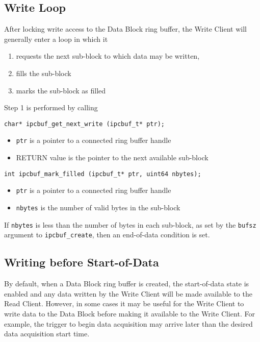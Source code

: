 \subsection{Write Loop}

After locking write access to the Data Block ring buffer, the Write
Client will generally enter a loop in which it
\begin{enumerate}
\item requests the next sub-block to which data may be written, 
\vspace{-2mm}
\item fills the sub-block
\vspace{-2mm}
\item marks the sub-block as filled
\end{enumerate}
Step 1 is performed by calling
\begin{verbatim}
char* ipcbuf_get_next_write (ipcbuf_t* ptr);
\end{verbatim}
\vspace{-6mm}
\begin{itemize}
\item {\tt ptr} is a pointer to a connected ring buffer handle
\vspace{-2mm}
\item RETURN value is the pointer to the next available sub-block
\end{itemize}
\begin{verbatim}
int ipcbuf_mark_filled (ipcbuf_t* ptr, uint64 nbytes);
\end{verbatim}
\vspace{-6mm}
\begin{itemize}
\item {\tt ptr} is a pointer to a connected ring buffer handle
\vspace{-2mm}
\item {\tt nbytes} is the number of valid bytes in the sub-block
\end{itemize}

If {\tt nbytes} is less than the number of bytes in each sub-block, as
set by the {\tt bufsz} argument to {\tt ipcbuf\_create}, then an
end-of-data condition is set.

\subsection{Writing before Start-of-Data}
\label{sec:prewrite}

By default, when a Data Block ring buffer is created, the
start-of-data state is enabled and any data written by the Write
Client will be made available to the Read Client.  However, in some
cases it may be useful for the Write Client to write data to the Data
Block before making it available to the Write Client.  For example,
the trigger to begin data acquisition may arrive later than the
desired data acquisition start time.

